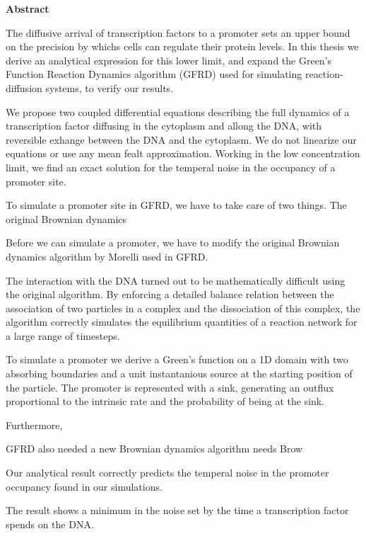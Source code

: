 \begin{center}
{\center \bf Abstract}
\end{center}

The diffusive arrival of transcription factors to a promoter sets an upper bound on the precision by whichs cells can regulate their protein levels. In this thesis we derive an analytical expression for this lower limit, and expand the Green's Function Reaction Dynamics algorithm (GFRD) used for simulating reaction-diffusion systems, to verify our results.

We propose two coupled differential equations describing the full dynamics of a transcription factor diffusing in the cytoplasm and allong the DNA, with reversible exhange between the DNA and the cytoplasm. We do not linearize our equations or use any mean fealt approximation. Working in the low concentration limit, we find an exact solution for the temperal noise in the occupancy of a promoter site. 




To simulate a promoter site in GFRD, we have to take care of two things. The original Brownian dynamics 


Before we can simulate a promoter, we have to modify the original Brownian dynamics algorithm by Morelli used in GFRD. 



The interaction with the DNA turned out to be mathematically difficult using the original algorithm. By enforcing a detailed balance relation between the association of two particles in a complex and the dissociation of this complex, the algorithm correctly simulates the equilibrium quantities of a reaction network for a large range of timesteps. 

To simulate a promoter we derive a Green's function on a 1D domain with two absorbing boundaries and a unit instantanious source at the starting position of the particle. The promoter is represented with a sink, generating an outflux proportional to the intrinsic rate and the probability of being at the sink. 

Furthermore, 


GFRD also needed a new Brownian dynamics algorithm needs Brow  





Our analytical result correctly predicts the temperal noise in the promoter occupancy found in our simulations.

The result shows a minimum in the noise set by the time a transcription factor spends on the DNA. 

